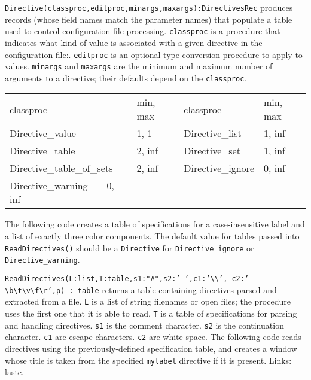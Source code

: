 \texttt{Directive(classproc,editproc,minargs,maxargs):DirectivesRec}
produces records (whose field names match the parameter names) that
populate a table used to control configuration file processing.
\texttt{classproc} is a procedure that indicates what kind of value is
associated with a given directive in the configuration file:.
\texttt{editproc} is an optional type conversion procedure to apply to
values. \texttt{minargs} and \texttt{maxargs} are the minimum and
maximum number of arguments to a directive; their defaults depend on
the \texttt{classproc}.

\begin{supertabular}{m{2.0in} m{0.9in} m{2.0in} m{0.9in}}
classproc & min, max & classproc & min, max \\
Directive\_value & 1, 1 & Directive\_list & 1, inf \\
Directive\_table & 2, inf & Directive\_set & 1, inf\\
Directive\_table\_of\_sets & 2, inf & Directive\_ignore & 0, inf\\
Directive\_warning\ \ \ \ 0, inf \\
\end{supertabular}

The following code creates a table of specifications for a
case-insensitive label and a list of exactly three color components.
The default value for tables passed into \texttt{ReadDirectives()}
should be a \texttt{Directive} for \texttt{Directive\_ignore} or
\texttt{Directive\_warning}.


\texttt{ReadDirectives(L:list,T:table,s1:"\#",s2:'-',c1:'{\textbackslash}{\textbackslash}',
c2:'
{\textbackslash}b{\textbackslash}t{\textbackslash}v{\textbackslash}f{\textbackslash}r',p)
: table} returns a table containing directives parsed and extracted
from a file. \texttt{L} is a list of string filenames or open files;
the procedure uses the first one that it is able to read. \texttt{T} is
a table of specifications for parsing and handling directives.
\texttt{s1} is the comment character. \texttt{s2} is the continuation
character. \texttt{c1} are escape characters. \texttt{c2} are white
space. The following code reads directives using the previously-defined
specification table, and creates a window whose title is taken from the
specified \texttt{mylabel} directive if it is present. Links: lastc.

